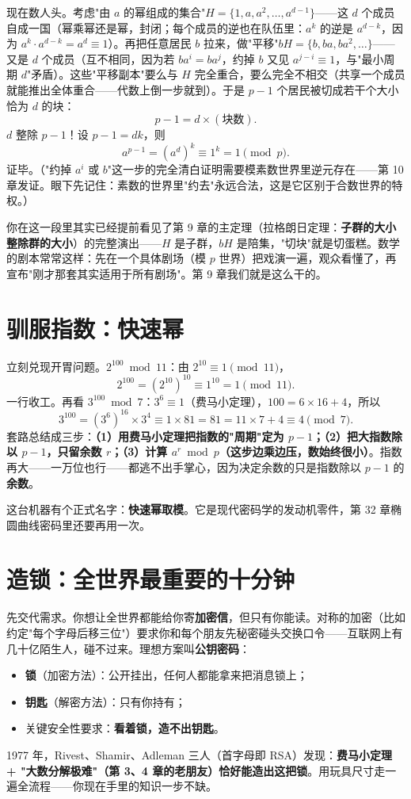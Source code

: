 现在数人头。考虑"由 $a$ 的幂组成的集合"$H = \{1, a, a^2, \dots, a^{d-1}\}$——这 $d$ 个成员自成一国（幂乘幂还是幂，封闭；每个成员的逆也在队伍里：$a^{k}$ 的逆是 $a^{d-k}$，因为 $a^k\cdot a^{d-k} = a^d \equiv 1$）。再把任意居民 $b$ 拉来，做"平移"$bH = \{b, ba, ba^2, \dots\}$——又是 $d$ 个成员（互不相同，因为若 $ba^i = ba^j$，约掉 $b$ 又见 $a^{j-i}\equiv 1$，与"最小周期 $d$"矛盾）。这些"平移副本"要么与 $H$ 完全重合，要么完全不相交（共享一个成员就能推出全体重合——代数上倒一步就到）。于是 $p-1$ 个居民被切成若干个大小恰为 $d$ 的块：
\[
p - 1 = d \times (\text{块数}) .
\]
$d$ 整除 $p-1$！设 $p-1 = dk$，则
\[
a^{p-1} = (a^d)^k \equiv 1^k = 1 \pmod p .
\]
证毕。（"约掉 $a^i$ 或 $b$"这一步的完全清白证明需要模素数世界里逆元存在——第 10 章发证。眼下先记住：素数的世界里"约去"永远合法，这是它区别于合数世界的特权。）

你在这一段里其实已经提前看见了第 9 章的主定理（拉格朗日定理：\textbf{子群的大小整除群的大小}）的完整演出——$H$ 是子群，$bH$ 是陪集，"切块"就是切蛋糕。数学的剧本常常这样：先在一个具体剧场（模 $p$ 世界）把戏演一遍，观众看懂了，再宣布"刚才那套其实适用于所有剧场"。第 9 章我们就是这么干的。

\section{驯服指数：快速幂}

立刻兑现开胃问题。$2^{100} \bmod 11$：由 $2^{10} \equiv 1 \pmod{11}$，
\[
2^{100} = (2^{10})^{10} \equiv 1^{10} = 1 \pmod{11}.
\]
一行收工。再看 $3^{100} \bmod 7$：$3^6 \equiv 1$（费马小定理），$100 = 6\times16 + 4$，所以
\[
3^{100} = (3^6)^{16} \times 3^4 \equiv 1 \times 81 = 81 = 11\times7 + 4 \equiv 4 \pmod 7 .
\]
套路总结成三步：\textbf{（1）用费马小定理把指数的"周期"定为 $p-1$；（2）把大指数除以 $p-1$，只留余数 $r$；（3）计算 $a^r \bmod p$（这步边乘边压，数始终很小）}。指数再大——一万位也行——都逃不出手掌心，因为决定余数的只是指数除以 $p-1$ 的\textbf{余数}。

这台机器有个正式名字：\textbf{快速幂取模}。它是现代密码学的发动机零件，第 32 章椭圆曲线密码里还要再用一次。

\section{造锁：全世界最重要的十分钟}

先交代需求。你想让全世界都能给你寄\textbf{加密信}，但只有你能读。对称的加密（比如约定"每个字母后移三位"）要求你和每个朋友先秘密碰头交换口令——互联网上有几十亿陌生人，碰不过来。理想方案叫\textbf{公钥密码}：
\begin{itemize}
\item \textbf{锁}（加密方法）：公开挂出，任何人都能拿来把消息锁上；
\item \textbf{钥匙}（解密方法）：只有你持有；
\item 关键安全性要求：\textbf{看着锁，造不出钥匙}。
\end{itemize}
1977 年，Rivest、Shamir、Adleman 三人（首字母即 RSA）发现：\textbf{费马小定理 + "大数分解极难"（第 3、4 章的老朋友）恰好能造出这把锁}。用玩具尺寸走一遍全流程——你现在手里的知识一步不缺。

